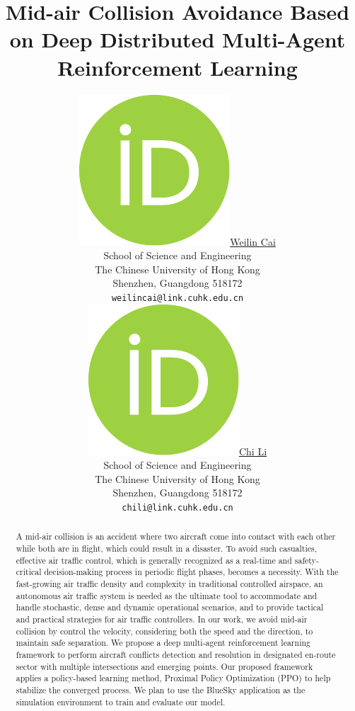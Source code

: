 \documentclass{article}
\title{Mid-air Collision Avoidance Based on Deep Distributed Multi-Agent Reinforcement Learning}
\author{ \href{https://orcid.org/0000-0001-7508-7567}{\includegraphics[scale=0.06]{orcid.pdf}\hspace{1mm}Weilin Cai}\\
	School of Science and Engineering\\
	The Chinese University of Hong Kong\\
	Shenzhen, Guangdong 518172 \\
	\texttt{weilincai@link.cuhk.edu.cn} \\
	\And
	\href{https://orcid.org/0000-0001-9936-4899}{\includegraphics[scale=0.06]{orcid.pdf}\hspace{1mm}Chi Li} \\
	School of Science and Engineering\\
	The Chinese University of Hong Kong\\
	Shenzhen, Guangdong 518172 \\
	\texttt{chili@link.cuhk.edu.cn} \\
}
\begin{document}
\maketitle

\begin{abstract}
	A mid-air collision is an accident where two aircraft come into contact with each other while both are in flight, which could result in a disaster. To avoid such casualties, effective air traffic control, which is generally recognized as a real-time and safety-critical decision-making process in periodic flight phases, becomes a necessity. With the fast-growing air traffic density and complexity in traditional controlled airspace, an autonomous air traffic system is needed as the ultimate tool to accommodate and handle stochastic, dense and dynamic operational scenarios, and to provide tactical and practical strategies for air traffic controllers. In our work, we avoid mid-air collision by control the velocity, considering both the speed and the direction, to maintain safe separation. We propose a deep multi-agent reinforcement learning framework to perform aircraft conflicts detection and resolution in designated en-route sector with multiple intersections and emerging points. Our proposed framework applies a policy-based learning method, Proximal Policy Optimization (PPO) to help stabilize the converged process. We plan to use the BlueSky application as the simulation environment to train and evaluate our model.
\end{abstract}







%







\end{document}
